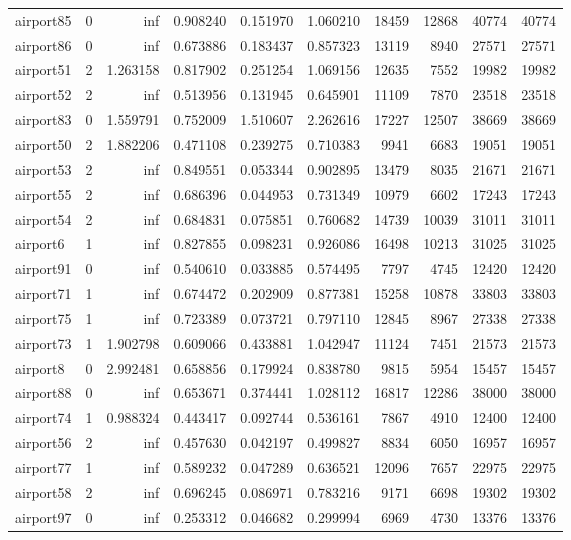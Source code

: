 \begin{longtable}{|l|r|r|r|r|r|r|r|r|r|}
airport85 & 0 & inf & 0.908240 & 0.151970 & 1.060210 & 18459 & 12868 & 40774 & 40774 \\
airport86 & 0 & inf & 0.673886 & 0.183437 & 0.857323 & 13119 & 8940 & 27571 & 27571 \\
airport51 & 2 & 1.263158 & 0.817902 & 0.251254 & 1.069156 & 12635 & 7552 & 19982 & 19982 \\
airport52 & 2 & inf & 0.513956 & 0.131945 & 0.645901 & 11109 & 7870 & 23518 & 23518 \\
airport83 & 0 & 1.559791 & 0.752009 & 1.510607 & 2.262616 & 17227 & 12507 & 38669 & 38669 \\
airport50 & 2 & 1.882206 & 0.471108 & 0.239275 & 0.710383 & 9941 & 6683 & 19051 & 19051 \\
airport53 & 2 & inf & 0.849551 & 0.053344 & 0.902895 & 13479 & 8035 & 21671 & 21671 \\
airport55 & 2 & inf & 0.686396 & 0.044953 & 0.731349 & 10979 & 6602 & 17243 & 17243 \\
airport54 & 2 & inf & 0.684831 & 0.075851 & 0.760682 & 14739 & 10039 & 31011 & 31011 \\
airport6 & 1 & inf & 0.827855 & 0.098231 & 0.926086 & 16498 & 10213 & 31025 & 31025 \\
airport91 & 0 & inf & 0.540610 & 0.033885 & 0.574495 & 7797 & 4745 & 12420 & 12420 \\
airport71 & 1 & inf & 0.674472 & 0.202909 & 0.877381 & 15258 & 10878 & 33803 & 33803 \\
airport75 & 1 & inf & 0.723389 & 0.073721 & 0.797110 & 12845 & 8967 & 27338 & 27338 \\
airport73 & 1 & 1.902798 & 0.609066 & 0.433881 & 1.042947 & 11124 & 7451 & 21573 & 21573 \\
airport8 & 0 & 2.992481 & 0.658856 & 0.179924 & 0.838780 & 9815 & 5954 & 15457 & 15457 \\
airport88 & 0 & inf & 0.653671 & 0.374441 & 1.028112 & 16817 & 12286 & 38000 & 38000 \\
airport74 & 1 & 0.988324 & 0.443417 & 0.092744 & 0.536161 & 7867 & 4910 & 12400 & 12400 \\
airport56 & 2 & inf & 0.457630 & 0.042197 & 0.499827 & 8834 & 6050 & 16957 & 16957 \\
airport77 & 1 & inf & 0.589232 & 0.047289 & 0.636521 & 12096 & 7657 & 22975 & 22975 \\
airport58 & 2 & inf & 0.696245 & 0.086971 & 0.783216 & 9171 & 6698 & 19302 & 19302 \\
airport97 & 0 & inf & 0.253312 & 0.046682 & 0.299994 & 6969 & 4730 & 13376 & 13376 \\

\end{longtable}
